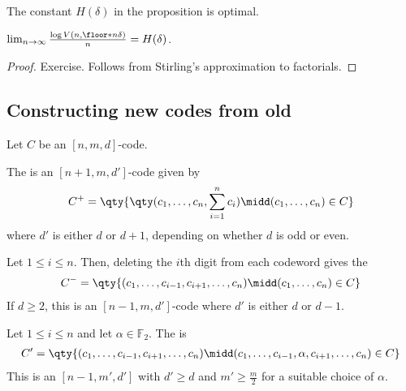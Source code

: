 The constant $H(\delta)$ in the proposition is optimal.
\begin{lemma}
    $\lim_{n \to \infty} \frac{\log V(n,\floor*{n\delta})}{n} = H(\delta)$.
\end{lemma}
\begin{proof}
    Exercise.
    Follows from Stirling's approximation to factorials.
\end{proof}

\subsection{Constructing new codes from old}
Let $C$ be an $[n,m,d]$-code.
\begin{example}
    The  is an $[n+1,m,d']$-code given by
    \begin{align*}
        C^+ = \qty{\qty(c_1, \dots, c_n, \sum_{i=1}^n c_i) \midd (c_1, \dots, c_n) \in C}
    \end{align*}
    where $d'$ is either $d$ or $d + 1$, depending on whether $d$ is odd or even.
\end{example}
\begin{example}
    Let $1 \leq i \leq n$.
    Then, deleting the $i$th digit from each codeword gives the 
    \begin{align*}
        C^- = \qty{(c_1, \dots, c_{i-1}, c_{i+1}, \dots, c_n) \midd (c_1, \dots, c_n) \in C}
    \end{align*}
    If $d \geq 2$, this is an $[n-1, m, d']$-code where $d'$ is either $d$ or $d - 1$.
\end{example}
\begin{example}
    Let $1 \leq i \leq n$ and let $\alpha \in \mathbb F_2$.
    The  is
    \begin{align*}
        C' = \qty{(c_1, \dots, c_{i-1}, c_{i+1}, \dots, c_n) \midd (c_1, \dots, c_{i-1}, \alpha, c_{i+1}, \dots, c_n) \in C}
    \end{align*}
    This is an $[n-1,m',d']$ with $d' \geq d$ and $m' \geq \frac{m}{2}$ for a suitable choice of $\alpha$.
\end{example}
